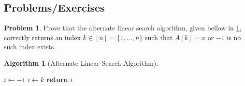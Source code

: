 \documentclass{article}
\theoremstyle{plain}
\theoremstyle{definition}
\newtheorem{problem}{Problem}
\newtheorem{algorithm}{Algorithm}
\begin{document}
\subsection{Problems/Exercises}

\begin{problem}
    Prove that the alternate linear search algorithm, given bellow in \cref{alg_lsearch_2}, correctly returns an index \(k \in [n] = \{1,\dotsc,n\}\) such that \(A[k] = x\) or \(-1\) is no such index exists. 

    \begin{algorithm}[Alternate Linear Search Algorithm] \phantom{}\label{alg_lsearch_2}
        \begin{center}
        \begin{minipage}{.5\linewidth}
        \begin{algorithmic}[1]
                \State \(i \leftarrow -1\)
                        \State \(i \leftarrow k\)
                    \EndIf
                \EndFor
                \State \textbf{return} \(i\)
            \EndProcedure
        \end{algorithmic}
        \end{minipage}
        \end{center}
        \end{algorithm}
\end{problem}
\end{document}
